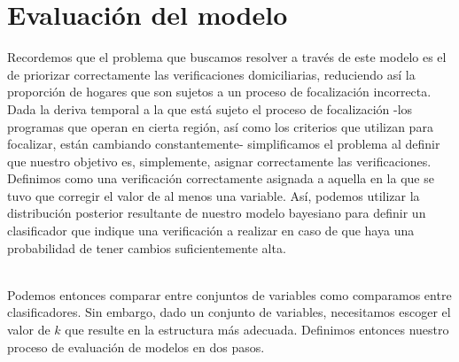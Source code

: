 \chapter{Evaluación del modelo}
\label{chap:evaluacion}
Recordemos que el problema que buscamos resolver a través de este modelo es el de priorizar correctamente las verificaciones domiciliarias, reduciendo así la proporción de hogares que son sujetos a un proceso de focalización incorrecta. Dada la deriva temporal a la que está sujeto el proceso de focalización -los programas que operan en cierta región, así como los criterios que utilizan para focalizar, están cambiando constantemente- simplificamos el problema al definir que nuestro objetivo es, simplemente, asignar correctamente las verificaciones. Definimos como una verificación correctamente asignada a aquella en la que se tuvo que corregir el valor de al menos una variable. Así, podemos utilizar la distribución posterior resultante de nuestro modelo bayesiano para definir un clasificador que indique una verificación a realizar en caso de que haya una probabilidad de tener cambios suficientemente alta.
\par
\noindent
\\
Podemos entonces comparar entre conjuntos de variables como comparamos entre clasificadores. Sin embargo, dado un conjunto de variables, necesitamos escoger el valor de $k$ que resulte en la estructura más adecuada. Definimos entonces nuestro proceso de evaluación de modelos en dos pasos.
